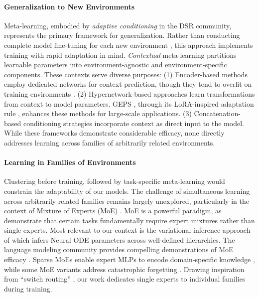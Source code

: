 \paragraph{Generalization to New Environments} Meta-learning, embodied by \emph{adaptive conditioning} \cite{serrano2024zebra} in the DSR community, represents the primary framework for generalization. Rather than conducting complete model fine-tuning for each new environment \cite{subramanian2024towards,herde2024poseidon}, this approach implements training with rapid adaptation in mind. \emph{Contextual} meta-learning partitions learnable parameters into environment-agnostic and environment-specific components. These contexts serve diverse purposes: (1) Encoder-based methods \cite{garnelo2018conditional,wang2022meta} employ dedicated networks for context prediction, though they tend to overfit on training environments \cite{kirchmeyer2022generalizing}. (2) Hypernetwork-based approaches \cite{kirchmeyer2022generalizing,brenner2024learning,blanke2024interpretable} learn transformations from context to model parameters. GEPS \cite{koupai2024boosting}, through its LoRA-inspired adaptation rule \cite{hu2021lora}, enhances these methods for large-scale applications. (3) Concatenation-based conditioning strategies \cite{zintgraf2019fast,nzoyem2025neural} incorporate context as direct input to the model. While these frameworks demonstrate considerable efficacy, none directly addresses learning across families of arbitrarily related environments.

\paragraph{Learning in Families of Environments} Clustering before training, followed by task-specific meta-learning \cite{nzoyem2025neural,kirchmeyer2022generalizing,koupai2024boosting,brenner2024learning} would constrain the adaptability of our models. The challenge of simultaneous learning across arbitrarily related families remains largely unexplored, particularly in the context of Mixture of Experts (MoE) \cite{jacobs1991adaptive}. MoE is a powerful paradigm, as \citet{chen2022towards} demonstrate that certain tasks fundamentally require expert mixtures rather than single experts. Most relevant to our context is the variational inference approach of \cite{roeder2019efficient,davidian2003nonlinear} which infers Neural ODE \cite{chen2018neural} parameters across well-defined hierarchies. The language modeling community provides compelling demonstrations of MoE efficacy \cite{shazeer2017outrageously}. Sparse MoEs enable expert MLPs to encode domain-specific knowledge \cite{dai2024deepseekmoe,jiang2024mixtral,guo2025deepseek}, while some MoE variants address catastrophic forgetting \cite{he2024mixture}. Drawing inspiration from ``switch routing'' \cite{fedus2022switch}, our work dedicates single experts to individual families during training.

